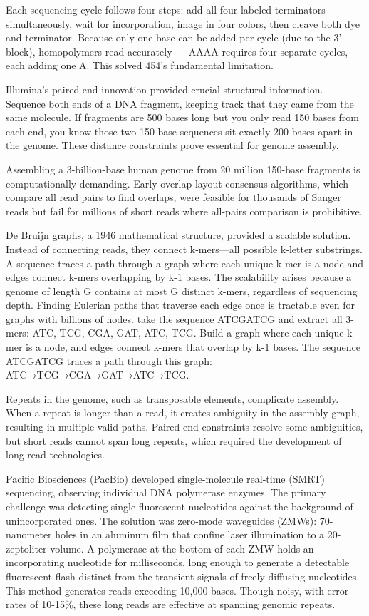 Each sequencing cycle follows four steps: add all four labeled terminators simultaneously, wait for incorporation, image in four colors, then cleave both dye and terminator. Because only one base can be added per cycle (due to the 3'-block), homopolymers read accurately — AAAA requires four separate cycles, each adding one A. This solved 454's fundamental limitation.

Illumina's paired-end innovation provided crucial structural information. Sequence both ends of a DNA fragment, keeping track that they came from the same molecule. If fragments are 500 bases long but you only read 150 bases from each end, you know those two 150-base sequences sit exactly 200 bases apart in the genome. These distance constraints prove essential for genome assembly.

Assembling a 3-billion-base human genome from 20 million 150-base fragments is computationally demanding. Early overlap-layout-consensus algorithms, which compare all read pairs to find overlaps, were feasible for thousands of Sanger reads but fail for millions of short reads where all-pairs comparison is prohibitive.

De Bruijn graphs, a 1946 mathematical structure, provided a scalable solution. Instead of connecting reads, they connect k-mers—all possible k-letter substrings. A sequence traces a path through a graph where each unique k-mer is a node and edges connect k-mers overlapping by k-1 bases. The scalability arises because a genome of length G contains at most G distinct k-mers, regardless of sequencing depth. Finding Eulerian paths that traverse each edge once is tractable even for graphs with billions of nodes. take the sequence ATCGATCG and extract all 3-mers: ATC, TCG, CGA, GAT, ATC, TCG. Build a graph where each unique k-mer is a node, and edges connect k-mers that overlap by k-1 bases. The sequence ATCGATCG traces a path through this graph: ATC→TCG→CGA→GAT→ATC→TCG.

Repeats in the genome, such as transposable elements, complicate assembly. When a repeat is longer than a read, it creates ambiguity in the assembly graph, resulting in multiple valid paths. Paired-end constraints resolve some ambiguities, but short reads cannot span long repeats, which required the development of long-read technologies.

Pacific Biosciences (PacBio) developed single-molecule real-time (SMRT) sequencing, observing individual DNA polymerase enzymes. The primary challenge was detecting single fluorescent nucleotides against the background of unincorporated ones. The solution was zero-mode waveguides (ZMWs): 70-nanometer holes in an aluminum film that confine laser illumination to a 20-zeptoliter volume. A polymerase at the bottom of each ZMW holds an incorporating nucleotide for milliseconds, long enough to generate a detectable fluorescent flash distinct from the transient signals of freely diffusing nucleotides. This method generates reads exceeding 10,000 bases. Though noisy, with error rates of 10-15\%, these long reads are effective at spanning genomic repeats.

